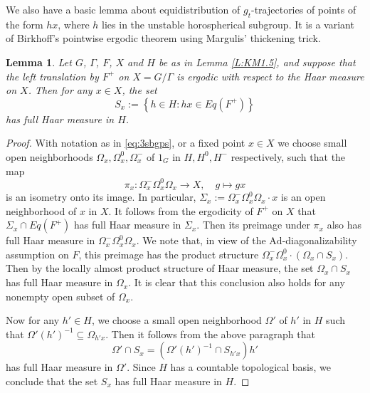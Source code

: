 \documentclass[reqno,12pt]{amsart}
\newtheorem{lemma}[theorem]{Lemma}
\theoremstyle{definition}
\numberwithin{equation}{section}
\newcommand{\Ad}{\mathrm{Ad}}
\newcommand {\new}[1]   {\textcolor{blue}{#1}}
\newcommand {\equ}[1]     {\eqref{eq:#1}}
\begin{document}
{{We also have} a basic lemma about {equidistribution of $g_t$-trajectories of points of the form $hx$, where $h$ lies in  the unstable horospherical subgroup. It} is a variant of Birkhoff's pointwise ergodic theorem using Margulis' thickening trick.

\begin{lemma}\label{L:densefull}
{Let $G$, $\Gamma$, $F$, $X$ and $H$ be as in Lemma \ref{L:KM1.5}, and} 
    suppose that the left translation by $F^+$ on $X=G/\Gamma$ is ergodic with respect to the Haar measure on $X$. Then for any $x\in X$, the set $$
    S_x:=\left\{h\in H: hx\in Eq(F^+)\right\}
    $$ has full Haar measure in $H$. 
\end{lemma}
\begin{proof}
   {With notation as in \equ{3sbgps},} or a fixed point $x\in X$ we choose small open neighborhoods $\Omega_x,\Omega_x^0,\Omega_x^-$ of $1_G$ in $H,H^0,H^-$ respectively, such that {the map} $$
    \pi_x:\Omega_x^-\Omega_x^0\Omega_x\to X,\quad g\mapsto gx
    $$ is an isometry onto its image. In particular, $\Sigma_x:=\Omega_x^-\Omega_x^0\Omega_x\cdot x$ is an open neighborhood of $x$ in $X$. It follows from the ergodicity of $F^+$ on $X$ that $\Sigma_x\cap Eq(F^+)$ has full Haar measure in $\Sigma_x$. Then its preimage under $\pi_x$ also has full Haar measure in $\Omega_x^-\Omega_x^0\Omega_x$. We note that, {in view of the $\Ad$-diagonalizability assumption on $F$,} this preimage has the product structure $\Omega_x^-\Omega_x^0\cdot(\Omega_x\cap S_x).$ Then by the locally almost product structure of Haar measure, the set $\Omega_x\cap S_x$ has full Haar measure in $\Omega_x$. It is clear that this conclusion also holds for any nonempty open subset of $\Omega_x$.

    Now for any $h'\in H$, we choose a small open neighborhood $\Omega'$ of $h'$ in $H$ such that $\Omega'(h')^{-1}\subseteq \Omega_{h'x}$. Then it follows from the above paragraph that $$\Omega'\cap S_x=(\Omega'(h')^{-1}\cap S_{h'x})h'$$ has full Haar measure in $\Omega'$. Since $H$ has a countable topological basis, we conclude that the set $S_x$ has full Haar measure in $H$. 
\end{proof}


}
\end{document}
